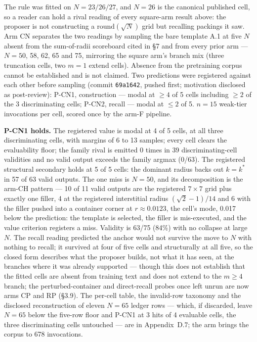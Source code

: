 The rule was fitted on $N = 23/26/27$, and $N = 26$ is the canonical published cell, so a reader can
hold a rival reading of every square-arm result above: the proposer is not constructing a
$\mathrm{round}(\sqrt{N})$ grid but recalling packings it saw. Arm CN separates the two readings by
sampling the bare template A.1 at five $N$ absent from the sum-of-radii scoreboard cited in \S7 and
from every prior arm --- $N = 50$, 58, 62, 65 and 75, mirroring the square arm's branch mix (three
truncation cells, two $m = 1$ extend cells). Absence from the pretraining corpus cannot be
established and is not claimed. Two predictions were registered against each other before sampling
(commit \texttt{69a1642}, pushed first; motivation disclosed as post-review): P-CN1, construction
--- modal at $\ge 4$ of 5 cells including $\ge 2$ of the 3 discriminating cells; P-CN2, recall ---
modal at $\le 2$ of 5. $n = 15$ weak-tier invocations per cell, scored once by the arm-F pipeline.

\textbf{P-CN1 holds.} The registered value is modal at 4 of 5 cells, at all three discriminating
cells, with margins of 6 to 13 samples; every cell clears the evaluability floor; the family rival
is emitted 0 times in 39 discriminating-cell validities and no valid output exceeds the family
argmax (0/63). The registered structural secondary holds at 5 of 5 cells: the dominant radius backs
out $k = k^*$ in 57 of 63 valid outputs. The one miss is $N = 50$, and its decomposition is the
arm-CH pattern --- 10 of 11 valid outputs are the registered $7 \times 7$ grid plus exactly one
filler, 4 at the registered interstitial radius $(\sqrt{2}-1)/14$ and 6 with the filler pushed into
a container corner at $r \approx 0.0123$, the cell's mode, 0.017 below the prediction: the template
is selected, the filler is mis-executed, and the value criterion registers a miss. Validity is
63/75 (84\%) with no collapse at large $N$. The recall reading predicted the anchor would not
survive the move to $N$ with nothing to recall; it survived at four of five cells and structurally
at all five, so the closed form describes what the proposer builds, not what it has seen, at the
branches where it was already supported --- though this does not establish that the fitted cells
are absent from training text and does not extend to the $m \ge 4$ branch; the perturbed-container
and direct-recall probes once left unrun are now arms CP and RP (\S3.9). The per-cell table, the invalid-row taxonomy and the disclosed
reconstruction of eleven $N = 65$ ledger rows --- which, if discarded, leave $N = 65$ below the
five-row floor and P-CN1 at 3 hits of 4 evaluable cells, the three discriminating cells untouched
--- are in Appendix~D.7; the arm brings the corpus to 678 invocations.


